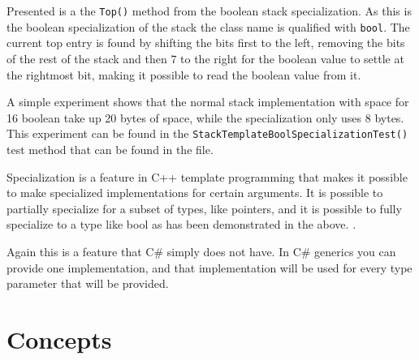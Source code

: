 Presented is a the \lstinline|Top()| method from the boolean stack specialization.
As this is the boolean specialization of the stack the class name is qualified with \texttt{bool}. 
The current top entry is found by shifting the bits first to the left, removing the bits of the rest of the stack and then 7 to the right for the boolean value to settle at the rightmost bit, making it possible to read the boolean value from it.

A simple experiment shows that the normal stack implementation with space for 16 boolean take up 20 bytes of space, while the specialization only uses 8 bytes.
This experiment can be found in the \lstinline|StackTemplateBoolSpecializationTest()| test method that can be found in the  file.

Specialization is a feature in C++ template programming that makes it possible to make specialized implementations for certain arguments.
It is possible to partially specialize for a subset of types, like pointers, and it is possible to fully specialize to a type like bool as has been demonstrated in the above. \cite[p.~730]{stroustrup2013c++}.

Again this is a feature that C\# simply does not have. 
In C\# generics you can provide one implementation, and that implementation will be used for every type parameter that will be provided.\cite{diff}

\section{Concepts}






